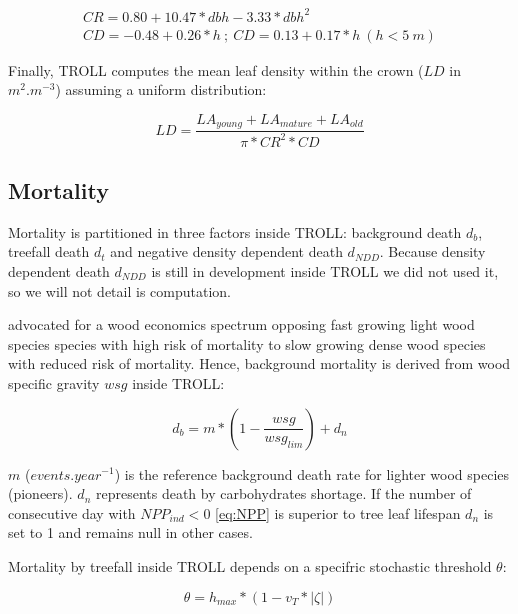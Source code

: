 \documentclass[]{article}
\theoremstyle{definition}
\theoremstyle{definition}
\theoremstyle{remark}
\begin{document}
\begin{equation}
  \begin{array}{c} \\
    CR = 0.80 + 10.47*dbh - 3.33*dbh^2\\
    CD = -0.48 + 0.26*h~;~CD = 0.13 + 0.17*h~(h<5~m)
  \end{array}
  \label{eq:C}
\end{equation}

Finally, TROLL computes the mean leaf density within the crown (\(LD\)
in \(m^2.m^{-3}\)) assuming a uniform distribution:

\begin{equation}
  LD = \frac{LA_{young}+LA_{mature}+LA_{old}}{\pi*CR^2*CD}
  \label{eq:LD}
\end{equation}

\subsection{Mortality}\label{mortality}

Mortality is partitioned in three factors inside TROLL: background death
\(d_b\), treefall death \(d_t\) and negative density dependent death
\(d_{NDD}\). Because density dependent death \(d_{NDD}\) is still in
development inside TROLL we did not used it, so we will not detail is
computation.

\citet{chave_towards_2009} advocated for a wood economics spectrum
opposing fast growing light wood species species with high risk of
mortality to slow growing dense wood species with reduced risk of
mortality. Hence, background mortality is derived from wood specific
gravity \(wsg\) inside TROLL:

\begin{equation}
  d_b = m*(1-\frac{wsg}{wsg_{lim}})+d_n
  \label{eq:db}
\end{equation}

\(m\) (\(events.year^{-1}\)) is the reference background death rate for
lighter wood species (pioneers). \(d_n\) represents death by
carbohydrates shortage. If the number of consecutive day with
\(NPP_{ind} < 0\) \eqref{eq:NPP} is superior to tree leaf lifespan \(d_n\)
is set to 1 and remains null in other cases.

Mortality by treefall inside TROLL depends on a specifric stochastic
threshold \(\theta\):

\begin{equation}
  \theta = h_{max}*(1-v_T*|\zeta|)
  \label{eq:theta}
\end{equation}
\end{document}
